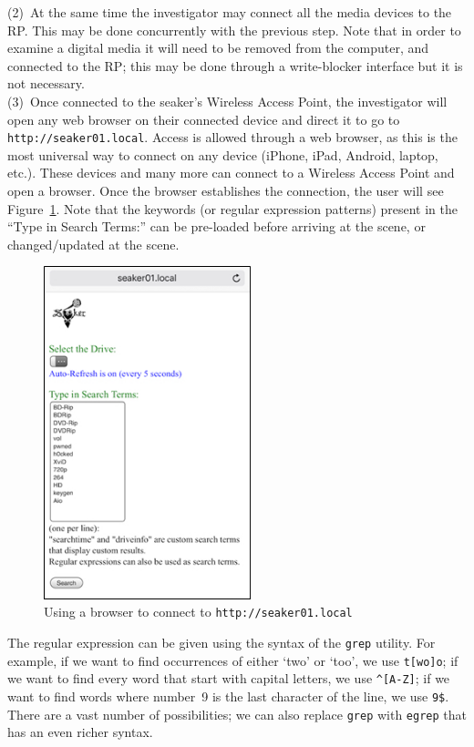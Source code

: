 \documentclass[12pt]{article}
\begin{document}
(2)~At the same time the investigator may connect all the media
devices to the RP. This may be done concurrently with the previous
step. Note that in order to examine a digital media it will need to be
removed from the
computer, and connected to the RP; this may be done through a
write-blocker interface but it is not necessary.\\

(3)~Once connected to the \gls{seaker}'s Wireless Access Point,
the investigator will open any
web browser on their connected device and direct it to go to
\verb|http://seaker01.local|. Access is allowed
through a web browser, as this is the most universal way to connect
on any device (iPhone, iPad, Android, laptop, etc.).  These
devices and many more can connect to a Wireless Access Point
and open a browser.  Once the browser establishes the
connection, the user will see Figure~\ref{fig:screen-2}. Note that the
keywords (or regular expression patterns) present in the ``Type in
Search Terms:'' can be pre-loaded before arriving at the scene, or
changed/updated at the scene.\\

\begin{figure}[H]
  \begin{center}
  \includegraphics[width=6cm]{images/seaker-hh-screen-2.jpg}
  \caption{Using a browser to connect to {\tt http://seaker01.local}}
  \label{fig:screen-2}
  \end{center}
\end{figure}

The regular expression can be given using the syntax of the
\verb|grep| utility. For example, if we want to find occurrences of
either `two' or `too', we use \verb|t[wo]o|; if we want to find every
word that start with capital letters, we use \verb|^[A-Z]|; if we want
to find words where number~9 is the last character of the line, we use
\verb|9$|. There are a vast number of possibilities; we can also
replace \verb|grep| with \verb|egrep| that has an even richer syntax.\\
\end{document}
